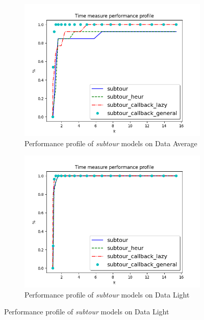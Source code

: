\begin{figure}[h]
	\begin{subfigure}{.5\textwidth}
		\centering
		\includegraphics[width=\columnwidth]{../res/Lsubtours_average_time.png}
		\caption{Performance profile of \textit{subtour} models on Data Average}
		\label{fig:res_subtour_av}
	\end{subfigure}
	\begin{subfigure}{.5\textwidth}
	\centering
	\includegraphics[width=\columnwidth]{../res/Lsubtours_light_time.png}
	\caption{Performance profile of \textit{subtour} models on Data Light}
	\label{fig:res_subtour_li}
	\end{subfigure}
\end{figure}


